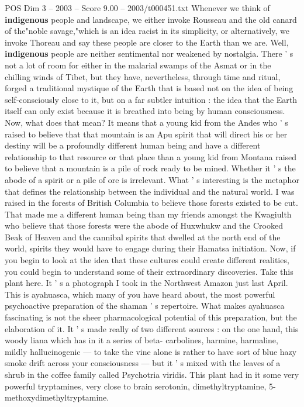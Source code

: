 \begin{textsample}{POS Dim 3 – 2003 – Score 9.00 – 2003/t000451.txt}
Whenever we think of \textbf{indigenous} people and landscape, we either invoke Rousseau and the old canard of the"noble savage,"which is an idea racist in its simplicity, or alternatively, we invoke Thoreau and say these people are closer to the Earth than we are.
Well, \textbf{indigenous} people are neither sentimental nor weakened by nostalgia.
There ' s not a lot of room for either in the malarial swamps of the Asmat or in the chilling winds of Tibet, but they have, nevertheless, through time and ritual, forged a traditional mystique of the Earth that is based not on the idea of being self-consciously close to it, but on a far subtler intuition : the idea that the Earth itself can only exist because it is breathed into being by human consciousness.
Now, what does that mean?
It means that a young kid from the Andes who ' s raised to believe that that mountain is an Apu spirit that will direct his or her destiny will be a profoundly different human being and have a different relationship to that resource or that place than a young kid from Montana raised to believe that a mountain is a pile of rock ready to be mined.
Whether it ' s the abode of a spirit or a pile of ore is irrelevant.
What ' s interesting is the metaphor that defines the relationship between the individual and the natural world.
I was raised in the forests of British Columbia to believe those forests existed to be cut.
That made me a different human being than my friends amongst the Kwagiulth who believe that those forests were the abode of Huxwhukw and the Crooked Beak of Heaven and the cannibal spirits that dwelled at the north end of the world, spirits they would have to engage during their Hamatsa initiation.
Now, if you begin to look at the idea that these cultures could create different realities, you could begin to understand some of their extraordinary discoveries.
Take this plant here.
It ' s a photograph I took in the Northwest Amazon just last April.
This is ayahuasca, which many of you have heard about, the most powerful psychoactive preparation of the shaman ' s repertoire.
What makes ayahuasca fascinating is not the sheer pharmacological potential of this preparation, but the elaboration of it.
It ' s made really of two different sources : on the one hand, this woody liana which has in it a series of beta- carbolines, harmine, harmaline, mildly hallucinogenic — to take the vine alone is rather to have sort of blue hazy smoke drift across your consciousness — but it ' s mixed with the leaves of a shrub in the coffee family called Psychotria viridis.
This plant had in it some very powerful tryptamines, very close to brain serotonin, dimethyltryptamine, 5-methoxydimethyltryptamine.

\end{textsample}
